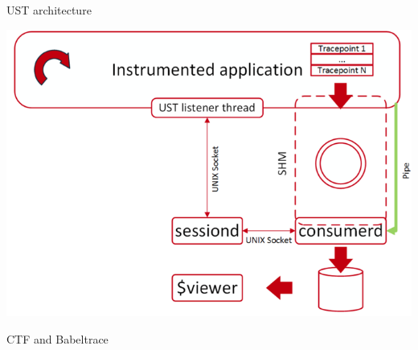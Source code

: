 \begin{frame}{UST architecture}
\begin{center}
\includegraphics[scale=0.5]{images/ust-architecture.png}
\end{center}
\end{frame}

\begin{frame}{CTF and Babeltrace}
\end{frame}
